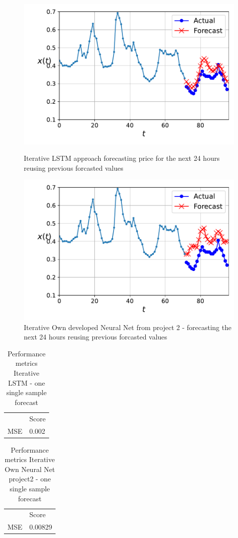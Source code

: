 \documentclass
[twocolumn,
secnumarabic,
nobibnotes,
aps,
prl,
reprint,
groupedaddress,
amsmath,
amssymb,
]{revtex4-2}
\begin{document}
\begin{figure}
  \includegraphics[width=\columnwidth]{figures/iterative_LSTM.pdf}
  \caption{\label{fig:iterative_LSTM}Iterative LSTM approach forecasting price for the next 24 hours reusing previous forcasted values}
  \includegraphics[width=\columnwidth]{figures/iterative_OWN_NN.pdf}
  \caption{\label{fig:iterative_LSTM}Iterative Own developed Neural Net from project 2 - forecasting the next 24 hours reusing previous forcasted values}
\end{figure}

\begin{table}[]
  \caption{\label{tab:iterativ_LSTM} Performance metrics Iterative LSTM - one single sample forecast}
  \begin{tabular}{l|l|}
       & Score   \\
  MSE  & 0.002 
  \end{tabular}
\end{table}
\begin{table}[]
  \caption{\label{tab:iterativ_own_NN} Performance metrics Iterative Own Neural Net project2 - one single sample forecast}
  \begin{tabular}{l|l|}
       & Score   \\
  MSE  & 0.00829 
  \end{tabular}
\end{table}
\end{document}
